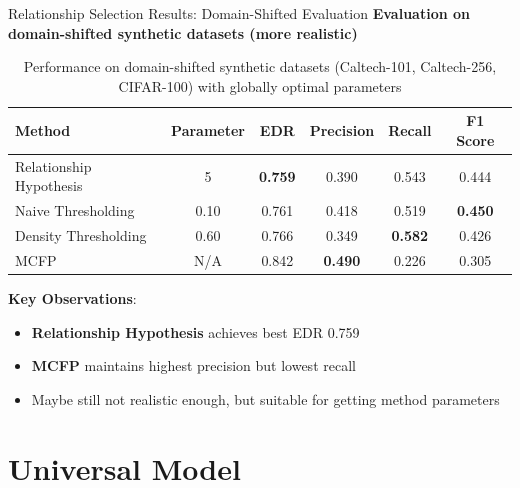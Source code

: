 \documentclass[aspectratio=169]{beamer}
\begin{document}
\begin{frame}{Relationship Selection Results: Domain-Shifted Evaluation}
    \textbf{Evaluation on domain-shifted synthetic datasets (more realistic)}

    \vspace{0.5em}

    \begin{table}[h]
        \centering
        \scriptsize
        \begin{tabular}{lccccc}
            \toprule
            \textbf{Method}         & \textbf{Parameter} & \textbf{EDR}   & \textbf{Precision} & \textbf{Recall} & \textbf{F1 Score} \\
            \midrule
            Relationship Hypothesis & 5                  & \textbf{0.759} & 0.390              & 0.543           & 0.444             \\
            Naive Thresholding      & 0.10               & 0.761          & 0.418              & 0.519           & \textbf{0.450}    \\
            Density Thresholding    & 0.60               & 0.766          & 0.349              & \textbf{0.582}  & 0.426             \\
            MCFP                    & N/A                & 0.842          & \textbf{0.490}     & 0.226           & 0.305             \\
            \bottomrule
        \end{tabular}
        \caption{Performance on domain-shifted synthetic datasets (Caltech-101, Caltech-256, CIFAR-100) with globally optimal parameters}
    \end{table}

    \vspace{0.5em}

    \textbf{Key Observations}:
    \begin{itemize}
        \item \textbf{Relationship Hypothesis} achieves best EDR 0.759
        \item \textbf{MCFP} maintains highest precision but lowest recall
        \item Maybe still not realistic enough, but suitable for getting method parameters
    \end{itemize}
\end{frame}


\section{Universal Model}
\end{document}

